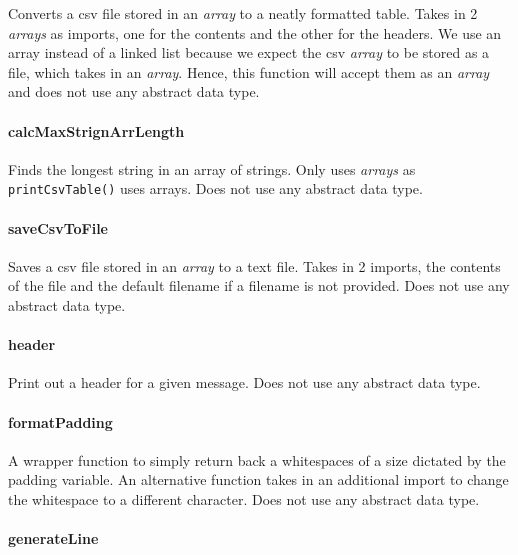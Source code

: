 \documentclass[a4paper, 12pt, titlepage]{article}
\newcommand{\code}[1]{\small\texttt{#1}\normalsize}
\begin{document}
Converts a csv file stored in an \textit{array} to a neatly formatted table.
Takes in 2 \textit{arrays} as imports, one for the contents and the other for
the headers. We use an array instead of a linked list because we expect the
csv \textit{array} to be stored as a file, which takes in an \textit{array}.
Hence, this function will accept them as an \textit{array} and does not
use any abstract data type.

\paragraph{calcMaxStrignArrLength} \hspace{0pt}

Finds the longest string in an array of strings. Only uses \textit{arrays}
as \code{printCsvTable()} uses arrays. Does not use any abstract data type.

\paragraph{saveCsvToFile} \hspace{0pt}

Saves a csv file stored in an \textit{array} to a text file. Takes in 2
imports, the contents of the file and the default filename if a filename
is not provided. Does not use any abstract data type.

\paragraph{header} \hspace{0pt}

Print out a header for a given message. Does not use any abstract data type.

\paragraph{formatPadding} \hspace{0pt}

A wrapper function to simply return back a whitespaces of a size dictated by
the padding variable. An alternative function takes in an additional
import to change the whitespace to a different character. Does not use any
abstract data type.

\paragraph{generateLine} \hspace{0pt}
\end{document}
